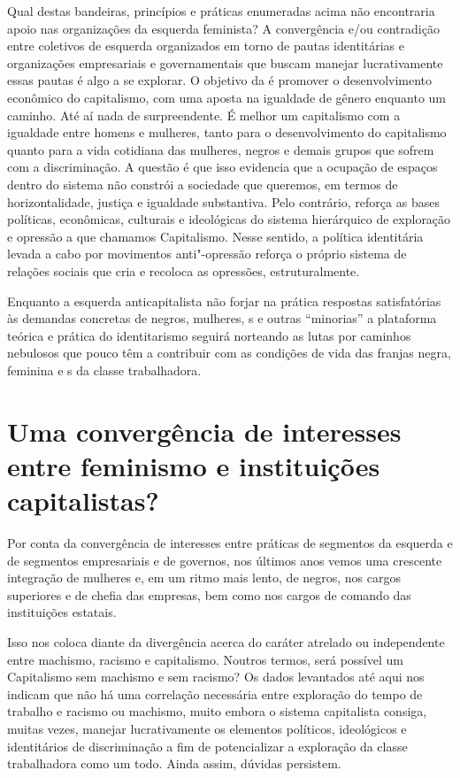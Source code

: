 Qual destas bandeiras, princípios e práticas enumeradas acima não
encontraria apoio nas organizações da esquerda feminista? A convergência
e/ou contradição entre coletivos de esquerda organizados em torno de
pautas identitárias e organizações empresariais e governamentais que
buscam manejar lucrativamente essas pautas é algo a se explorar. O
objetivo da  é promover o desenvolvimento econômico do capitalismo,
com uma aposta na igualdade de gênero enquanto um caminho. Até aí nada
de surpreendente. É melhor um capitalismo com a igualdade entre homens e
mulheres, tanto para o desenvolvimento do capitalismo quanto para a vida
cotidiana das mulheres, negros e demais grupos que sofrem com a
discriminação. A questão é que isso evidencia que a ocupação de espaços
dentro do sistema não constrói a sociedade que queremos, em termos de
horizontalidade, justiça e igualdade substantiva. Pelo contrário,
reforça as bases políticas, econômicas, culturais e ideológicas do
sistema hierárquico de exploração e opressão a que chamamos Capitalismo.
Nesse sentido, a política identitária levada a cabo por movimentos
anti"-opressão reforça o próprio sistema de relações sociais que cria e
recoloca as opressões, estruturalmente.

Enquanto a esquerda anticapitalista não forjar na prática respostas
satisfatórias às demandas concretas de negros, mulheres, s e outras
``minorias'' a plataforma teórica e prática do identitarismo seguirá
norteando as lutas por caminhos nebulosos que pouco têm a contribuir com
as condições de vida das franjas negra, feminina e s da classe
trabalhadora.

\chapter{Uma convergência de interesses entre feminismo e instituições capitalistas?}

Por conta da convergência de interesses entre práticas de segmentos da
esquerda e de segmentos empresariais e de governos, nos últimos anos
vemos uma crescente integração de mulheres e, em um ritmo mais lento, de
negros, nos cargos superiores e de chefia das empresas, bem como nos
cargos de comando das instituições estatais.

Isso nos coloca diante da divergência acerca do caráter atrelado ou
independente entre machismo, racismo e capitalismo. Noutros termos, será
possível um Capitalismo sem machismo e sem racismo? Os dados levantados
até aqui nos indicam que não há uma correlação necessária entre
exploração do tempo de trabalho e racismo ou machismo, muito embora o
sistema capitalista consiga, muitas vezes, manejar lucrativamente os
elementos políticos, ideológicos e identitários de discriminação a fim
de potencializar a exploração da classe trabalhadora como um todo. Ainda
assim, dúvidas persistem.

